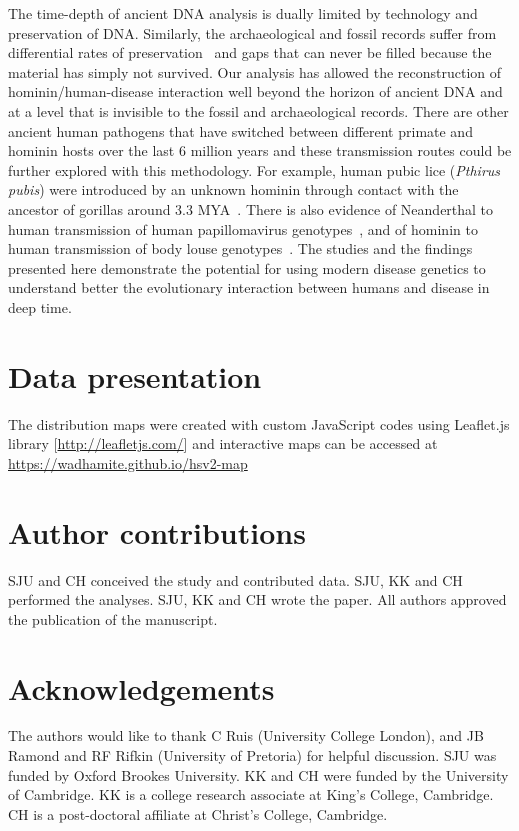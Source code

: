 \documentclass[fleqn,10pt]{wlscirep}
\begin{document}
The time-depth of ancient DNA analysis is dually limited by technology and preservation of DNA. Similarly, the archaeological and fossil records suffer from differential rates of preservation~\citep{Allentoft2012} and gaps that can never be filled because the material has simply not survived. Our analysis has allowed the reconstruction of hominin/human-disease interaction well beyond the horizon of ancient DNA and at a level that is invisible to the fossil and archaeological records. There are other ancient human pathogens that have switched between different primate and hominin hosts over the last 6 million years and these transmission routes could be further explored with this methodology. For example, human pubic lice (\textit{Pthirus pubis}) were introduced by an unknown hominin through contact with the ancestor of gorillas around 3.3 MYA~\citep{Reed2007}. There is also evidence of Neanderthal to human transmission of human papillomavirus genotypes~\citep{Pimenoff2017}, and of hominin to human transmission of body louse genotypes~\citep{Reed2004a}. The studies and the findings presented here demonstrate the potential for using modern disease genetics to understand better the evolutionary interaction between humans and disease in deep time.

\section*{Data presentation}
The distribution maps were created with custom JavaScript codes using Leaflet.js library  [\url{http://leafletjs.com/}] and interactive maps can be accessed at \url{https://wadhamite.github.io/hsv2-map}

\section*{Author contributions}
SJU and CH conceived the study and contributed data. SJU, KK and CH performed the analyses. SJU, KK and CH wrote the paper. All authors approved the publication of the manuscript.

\section*{Acknowledgements}
The authors would like to thank C Ruis (University College London), and JB Ramond and RF Rifkin (University of Pretoria) for helpful discussion. SJU was funded by Oxford Brookes University. KK and CH were funded by the University of Cambridge. KK is a college research associate at King’s College, Cambridge. CH is a post-doctoral affiliate at Christ’s College, Cambridge.
\end{document}
